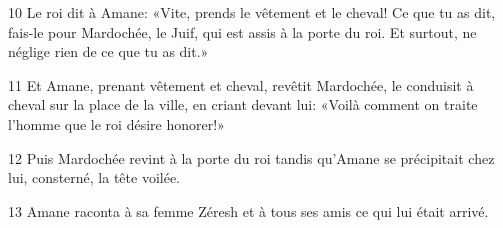 
10 Le roi dit à Amane: «Vite, prends le vêtement et le cheval! Ce que tu as dit, fais-le pour Mardochée, le Juif, qui est assis à la porte du roi. Et surtout, ne néglige rien de ce que tu as dit.»

11 Et Amane, prenant vêtement et cheval, revêtit Mardochée, le conduisit à cheval sur la place de la ville, en criant devant lui: «Voilà comment on traite l’homme que le roi désire honorer!»

12 Puis Mardochée revint à la porte du roi tandis qu’Amane se précipitait chez lui, consterné, la tête voilée.

13 Amane raconta à sa femme Zéresh et à tous ses amis ce qui lui était arrivé.
